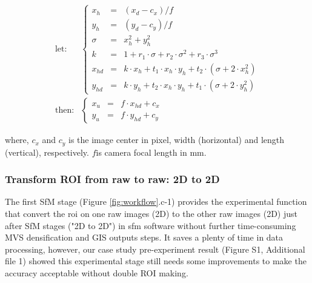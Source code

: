\documentclass{configs/bmcart}
\begin{document}
\begin{align}
  \label{eq:px_correct}
  \text{let:} &
  \left\{\begin{array}{lll}
    x_h & = & (x_d - c_x) / f \\
    y_h & = & (y_d - c_y) / f \\
    \sigma & = & x_h^2 + y_h^2 \\
    k      & = & 1 + r_1 \cdot \sigma + r_2 \cdot \sigma^2 + r_3 \cdot \sigma^3 \\
    x_{hd} & = & k \cdot x_h + t_1 \cdot x_h \cdot y_h + t_2 \cdot (\sigma + 2 \cdot x_h^2) \\
    y_{hd} & = & k \cdot y_h + t_2 \cdot x_h \cdot y_h + t_1 \cdot (\sigma + 2 \cdot y_h^2)
  \end{array} \right. \nonumber \\
  \text{then:} &
  \left\{\begin{array}{lll}
    x_u & = & f \cdot x_{hd} + c_x \\
    y_u & = & f \cdot y_{hd} + c_y
  \end{array} \right.
\end{align}

where, $c_x$ and $c_y$ is the image center in pixel, width (horizontal) and length (vertical), respectively. $f$is camera focal length in mm. 

\subsubsection*{Transform ROI from raw to raw: 2D to 2D}
The first SfM stage (Figure \ref{fig:workflow}.c-1) provides the experimental function that convert the \acrfull*{roi} on one raw images (2D) to the other raw images (2D) just after SfM stages ("2D to 2D") in \acrlong*{sfm} software without further time-consuming MVS densification and GIS outputs steps. It saves a plenty of time in data processing, however, our case study pre-experiment result (Figure S1, Additional file 1) showed this experimental stage still needs some improvements to make the accuracy acceptable without double ROI making.
\end{document}
